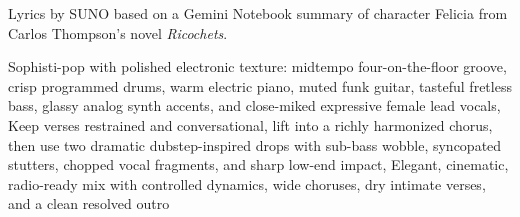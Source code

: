 
\begin{notes}
Lyrics by SUNO based on a Gemini Notebook summary of character Felicia from Carlos Thompson's novel \emph{Ricochets}.
\end{notes}
\begin{style}
Sophisti-pop with polished electronic texture: midtempo four-on-the-floor groove, crisp programmed drums, warm electric piano, muted funk guitar, tasteful fretless bass, glassy analog synth accents, and close-miked expressive female lead vocals, Keep verses restrained and conversational, lift into a richly harmonized chorus, then use two dramatic dubstep-inspired drops with sub-bass wobble, syncopated stutters, chopped vocal fragments, and sharp low-end impact, Elegant, cinematic, radio-ready mix with controlled dynamics, wide choruses, dry intimate verses, and a clean resolved outro
\end{style}
